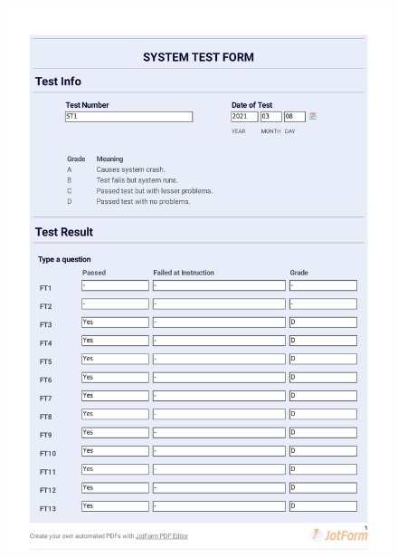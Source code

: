 \documentclass{article}
\begin{document}
 \begin{figure}
     \centering
     \includegraphics[trim={0cm 3.5cm 0cm 0cm}, clip,width=13cm]{images/2021-03-08_Alexander_ST1-1}
     \renewcommand\figurename{Figure}
     \label{fig:my_label}
 \end{figure}
 
\end{document}
